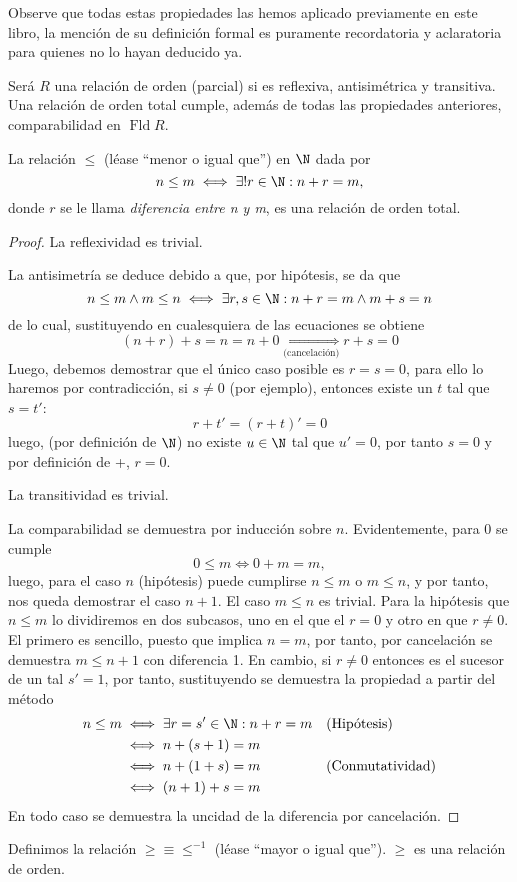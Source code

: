 \documentclass[11pt,oneside,a4paper]{book}
\DeclareMathOperator{\Fld}{Fld}
\begin{document}
Observe que todas estas propiedades las hemos aplicado previamente en este libro, la mención de su definición formal es puramente recordatoria y aclaratoria para quienes no lo hayan deducido ya.
\begin{mydef}
Será $R$ una relación de orden (parcial) si es reflexiva, antisimétrica y transitiva. Una relación de orden total cumple, además de todas las propiedades anteriores, comparabilidad en $\Fld R$.
\end{mydef}
\begin{thm}
La relación $\leq$ (léase ``menor o igual que'') en $\N$ dada por
$$n\leq m\iff\exists! r\in\N:n+r=m,$$
donde $r$ se le llama \textit{diferencia entre n y m}, es una relación de orden total.
\end{thm}
\begin{proof}
La reflexividad es trivial.

La antisimetría se deduce debido a que, por hipótesis, se da que
$$n\leq m\wedge m\leq n\iff\exists r,s\in\N:n+r=m\wedge m+s=n$$
de lo cual, sustituyendo en cualesquiera de las ecuaciones se obtiene
$$(n+r)+s=n=n+0\underset{\text{(cancelación)}}{\iff} r+s=0$$
Luego, debemos demostrar que el único caso posible es $r=s=0$, para ello lo haremos por contradicción, si $s\neq 0$ (por ejemplo), entonces existe un $t$ tal que $s=t'$:
$$r+t'=(r+t)'=0$$
luego, (por definición de $\N$) no existe $u\in\N$ tal que $u'=0$, por tanto $s=0$ y por definición de +, $r=0$.

La transitividad es trivial.

La comparabilidad se demuestra por inducción sobre $n$. Evidentemente, para 0 se cumple
$$0\leq m\iff 0+m=m,$$
luego, para el caso $n$ (hipótesis) puede cumplirse $n\leq m$ o $m\leq n$, y por tanto, nos queda demostrar el caso $n+1$. El caso $m\leq n$ es trivial. Para la hipótesis que $n\leq m$ lo dividiremos en dos subcasos, uno en el que el $r=0$ y otro en que $r\neq 0$. El primero es sencillo, puesto que implica $n=m$, por tanto, por cancelación se demuestra $m\leq n+1$ con diferencia 1. En cambio, si $r\neq 0$ entonces es el sucesor de un tal $s'=1$, por tanto, sustituyendo se demuestra la propiedad a partir del método
$$\begin{aligned}
n\leq m&\iff \exists r=s'\in\N:n+r=m &&\text{(Hipótesis)}\\
&\iff n+(s+1)=m\\
&\iff n+(1+s)=m &&\text{(Conmutatividad)}\\
&\iff (n+1)+s=m
\end{aligned}$$
En todo caso se demuestra la uncidad de la diferencia por cancelación.
\end{proof}
Definimos la relación ${\geq}\equiv{\leq^{-1}}$ (léase ``mayor o igual que''). $\geq$ es una relación de orden.
\end{document}
